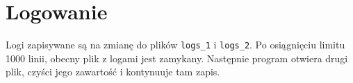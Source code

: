 \documentclass[11pt]{article}
\begin{document}
\section{Logowanie}

Logi zapisywane są na zmianę do plików \verb|logs_1| i \verb|logs_2|. Po osiągnięciu limitu 1000 linii, obecny plik z logami jest zamykany. Następnie program otwiera drugi plik, czyści jego zawartość i kontynuuje tam zapis. 

\end{document}
